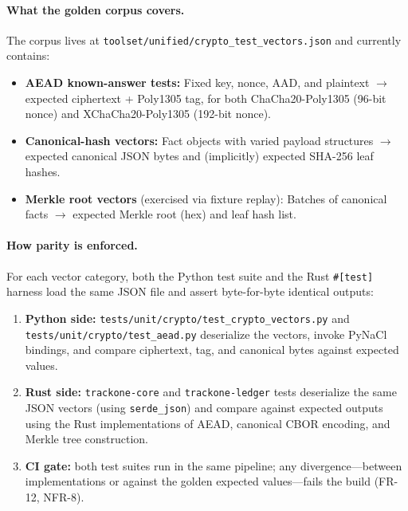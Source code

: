 \paragraph{What the golden corpus covers.}
The corpus lives at \texttt{toolset/unified/crypto\_test\_vectors.json} and currently contains:
\begin{itemize}[nosep]
    \item \textbf{AEAD known-answer tests:}
    Fixed key, nonce, \ac{AAD}, and plaintext $\rightarrow$ expected ciphertext + Poly1305 tag,
    for both ChaCha20-Poly1305 (96-bit nonce) and XChaCha20-Poly1305 (192-bit nonce).
    \item \textbf{Canonical-hash vectors:}
    Fact objects with varied payload structures $\rightarrow$ expected canonical \ac{JSON} bytes
    and (implicitly) expected \ac{SHA}-256 leaf hashes.
    \item \textbf{Merkle root vectors} (exercised via fixture replay):
    Batches of canonical facts $\rightarrow$ expected Merkle root (hex) and leaf hash list.
\end{itemize}

\paragraph{How parity is enforced.}
For each vector category, both the Python test suite and the Rust \texttt{\#[test]} harness
load the same \ac{JSON} file and assert byte-for-byte identical outputs:
\begin{enumerate}[nosep]
    \item \textbf{Python side:} \texttt{tests/unit/crypto/test\_crypto\_vectors.py} and
    \texttt{tests/unit/crypto/test\_aead.py} deserialize the vectors, invoke PyNaCl bindings,
    and compare ciphertext, tag, and canonical bytes against expected values.
    \item \textbf{Rust side:} \texttt{trackone-core} and \texttt{trackone-ledger} tests deserialize
    the same \ac{JSON} vectors (using \texttt{serde\_json}) and compare against expected outputs
    using the Rust implementations of \ac{AEAD}, canonical \ac{CBOR} encoding, and Merkle tree construction.
    \item \textbf{CI gate:} both test suites run in the same pipeline; any divergence---between
    implementations or against the golden expected values---fails the build (FR-12, NFR-8).
\end{enumerate}

